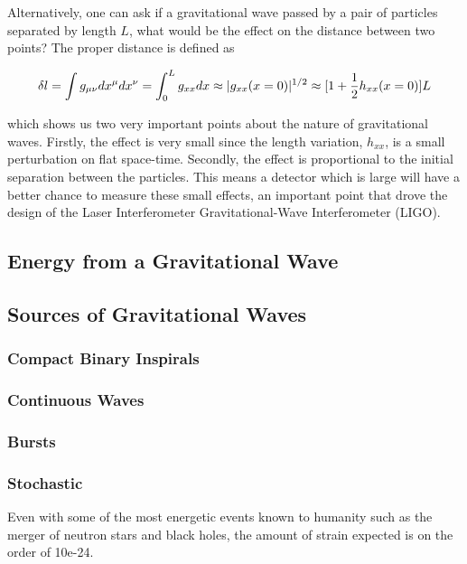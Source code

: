 	Alternatively, one can ask if a gravitational wave passed by a pair of particles separated by length $L$, what would be the effect on the distance between two points?  The proper distance is defined as

	\begin{equation}\label{propdist}
	\delta l
	= \int{g_{\mu \nu} dx^{\mu} dx^{\nu}} \\
	= \int_{0}^{L}{g_{xx} {d}x}\\
	\approx |g_{xx}(x=0)|^{1/2}\\
	\approx [ 1 + \frac{1}{2} h_{xx}(x=0)] L
	\end{equation} 
	
	which shows us two very important points about the nature of gravitational waves.  Firstly, the effect is very small since the length variation, $h_{xx}$, is a small perturbation on flat space-time.  Secondly, the effect is proportional to the initial separation between the particles. This means a detector which is large will have a better chance to measure these small effects, an important point that drove the design of the Laser Interferometer Gravitational-Wave Interferometer (LIGO).
	
	
	\subsection{Energy from a Gravitational Wave}
	
	\subsection{Sources of Gravitational Waves}
	\subsubsection{Compact Binary Inspirals}
	\subsubsection{Continuous Waves}
	\subsubsection{Bursts}
	\subsubsection{Stochastic}
	Even with some of the most energetic events known to humanity such as the merger of neutron stars and black holes, the amount of strain expected is on the order of 10e-24.
	
